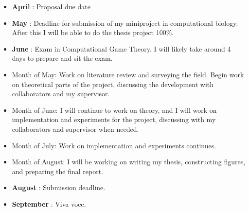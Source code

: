 \documentclass[11pt]{article}
\begin{document}
    \begin{itemize}
        \item \textbf{April }: Proposal due date
        \item \textbf{May }: Deadline for submission of my miniproject in computational biology.
              After this I will be able to do the thesis project 100\%.
        \item \textbf{June }: Exam in Computational Game Theory.
              I will likely take around 4 days to prepare and sit the exam.
        \item Month of May: Work on literature review and surveying the field.
              Begin work on theoretical parts of the project, discussing the development with collaborators and my supervisor.
        \item Month of June: I will continue to work on theory, and I will work on implementation and experiments for the project, discussing with my collaborators and supervisor when needed.
        \item Month of July: Work on implementation and experiments continues.
        \item Month of August: I will be working on writing my thesis, constructing figures, and preparing the final report.
        \item \textbf{August }: Submission deadline.
        \item \textbf{September }: Viva voce.
    \end{itemize}

    \clearpage
    
    
\end{document}
